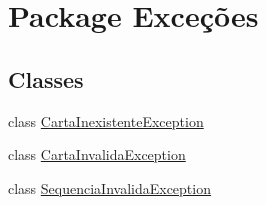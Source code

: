 \hypertarget{namespace_exce_xC3_xA7_xC3_xB5es}{
\section{\-Package \-Exceções}
\label{namespace_exce_xC3_xA7_xC3_xB5es}
}
\subsection*{\-Classes}
\begin{DoxyCompactItemize}
\item 
class \hyperlink{class_exce_xC3_xA7_xC3_xB5es_1_1_carta_inexistente_exception}{\-Carta\-Inexistente\-Exception}
\item 
class \hyperlink{class_exce_xC3_xA7_xC3_xB5es_1_1_carta_invalida_exception}{\-Carta\-Invalida\-Exception}
\item 
class \hyperlink{class_exce_xC3_xA7_xC3_xB5es_1_1_sequencia_invalida_exception}{\-Sequencia\-Invalida\-Exception}
\end{DoxyCompactItemize}
